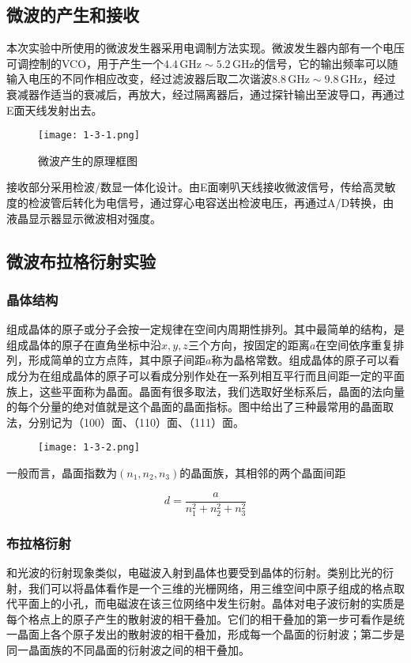 \documentclass[12pt]{article}
\begin{document}
\subsection{微波的产生和接收}
本次实验中所使用的微波发生器采用电调制方法实现。微波发生器内部有一个电压可调控制的VCO，用于产生一个$ 4.4\,\mathrm{GHz}\sim 5.2\,\mathrm{GHz} $的信号，它的输出频率可以随输入电压的不同作相应改变，经过滤波器后取二次谐波$ 8.8\,\mathrm{GHz}\sim9.8\,\mathrm{GHz} $，经过衰减器作适当的衰减后，再放大，经过隔离器后，通过探针输出至波导口，再通过E面天线发射出去。

\begin{figure}[htbp]
    \centering
    \texttt{[image: 1-3-1.png]}
    \caption{微波产生的原理框图}
\end{figure}
		
接收部分采用检波/数显一体化设计。由E面喇叭天线接收微波信号，传给高灵敏度的检波管后转化为电信号，通过穿心电容送出检波电压，再通过A/D转换，由液晶显示器显示微波相对强度。

\subsection{微波布拉格衍射实验}
\subsubsection{晶体结构}
组成晶体的原子或分子会按一定规律在空间内周期性排列。其中最简单的结构，是组成晶体的原子在直角坐标中沿$ x,y,z $三个方向，按固定的距离$a$在空间依序重复排列，形成简单的立方点阵，其中原子间距$a$称为晶格常数。组成晶体的原子可以看成分为在组成晶体的原子可以看成分别作处在一系列相互平行而且间距一定的平面族上，这些平面称为晶面。晶面有很多取法，我们选取好坐标系后，晶面的法向量的每个分量的绝对值就是这个晶面的晶面指标。图中给出了三种最常用的晶面取法，分别记为（100）面、（110）面、（111）面。

\begin{figure}[htbp]
    \centering
    \texttt{[image: 1-3-2.png]}
\end{figure}

一般而言，晶面指数为$(n_1,n_2,n_3)$的晶面族，其相邻的两个晶面间距

\[
    d=\frac{a}{n_1^2+n_2^2+n_3^2}
\]

\subsubsection{布拉格衍射}
和光波的衍射现象类似，电磁波入射到晶体也要受到晶体的衍射。类别比光的衍射，我们可以将晶体看作是一个三维的光栅网络，用三维空间中原子组成的格点取代平面上的小孔，而电磁波在该三位网络中发生衍射。晶体对电子波衍射的实质是每个格点上的原子产生的散射波的相干叠加。它们的相干叠加的第一步可看作是统一晶面上各个原子发出的散射波的相干叠加，形成每一个晶面的衍射波；第二步是同一晶面族的不同晶面的衍射波之间的相干叠加。
\end{document}
